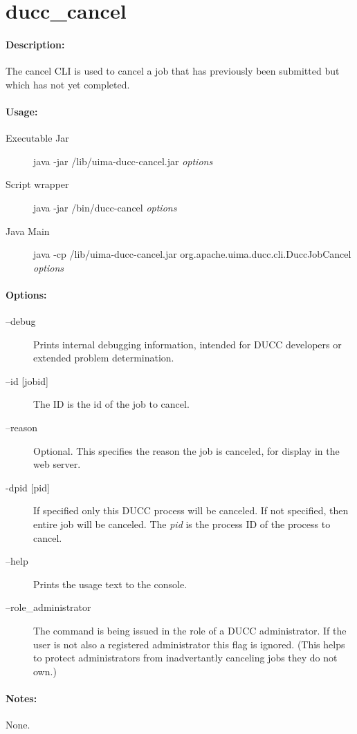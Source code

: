 \ifpdf
\else
{}
\fi
    \section{ducc\_cancel}

    \paragraph{Description:}
    The cancel CLI is used to cancel a job that has previously been submitted but which has not yet 
    completed. 

    \paragraph{Usage:}
    \begin{description}
    \item[Executable Jar] java -jar \ducchome/lib/uima-ducc-cancel.jar {\em options}
    \item[Script wrapper] java -jar \ducchome/bin/ducc-cancel {\em options}
    \item[Java Main]      java -cp \ducchome/lib/uima-ducc-cancel.jar org.apache.uima.ducc.cli.DuccJobCancel {\em options}
    \end{description}

    \paragraph{Options:}
    \begin{description}
        \item[--debug ]          
          Prints internal debugging information, intended for DUCC developers or extended problem determination.                    
        \item[--id {[jobid]}]
          The ID is the id of the job to cancel.
        \item[--reason]
          Optional. This specifies the reason the job is canceled, for display in the web server.
        \item[-dpid {[pid]}]
          If specified only this DUCC process will be canceled.  If not
          specified, then entire job will be canceled.  The {\em pid} is the process ID of the
          process to cancel.
        \item[--help]
          Prints the usage text to the console. 
        \item[--role\_administrator] The command is being issued in the role of a DUCC administrator.
          If the user is not also a registered administrator this flag is ignored.  (This helps to
          protect administrators from inadvertantly canceling jobs they do not own.)
     \end{description}
        
    \paragraph{Notes:}
    None.

